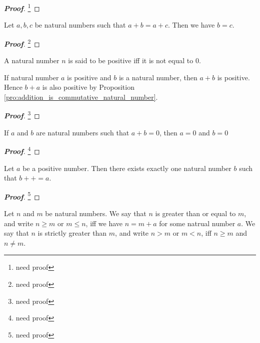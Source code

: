 \begin{proof}[\bf Proof]
\footnote{need proof}
\end{proof}

\begin{proposition}
Let $a,b,c$ be natural numbers such that $a+b = a+c$. Then we have $b=c$.
\end{proposition}

\begin{proof}[\bf Proof]
\footnote{need proof}
\end{proof}

\begin{definition}
A natural number $n$ is said to be positive iff it is not equal to 0.
\end{definition}

\begin{proposition}
If natural number $a$ is positive and $b$ is a natural number, then $a+b$ is positive. Hence $b+a$ is also positive by Proposition \ref{pro:addition_is_commutative_natural_number}.
\end{proposition}

\begin{proof}[\bf Proof]
\footnote{need proof}
\end{proof}

\begin{corollary}
If $a$ and $b$ are natural numbers such that $a+b = 0$, then $a=0$ and $b=0$
\end{corollary}

\begin{proof}[\bf Proof]
\footnote{need proof}
\end{proof}

\begin{lemma}
Let $a$ be a positive number. Then there exists exactly one natural number $b$ such that $b++ = a$.
\end{lemma}

\begin{proof}[\bf Proof]
\footnote{need proof}
\end{proof}

\begin{definition}
Let $n$ and $m$ be natural numbers. We say that $n$ is greater than or equal to $m$, and write $n\geq m$ or $m\leq n$, iff we have $n=m+a$ for some natrual number $a$. We say that $n$ is strictly greater than $m$, and write $n>m$ or $m<n$, iff $n\geq m$ and $n\neq m$.
\end{definition}

